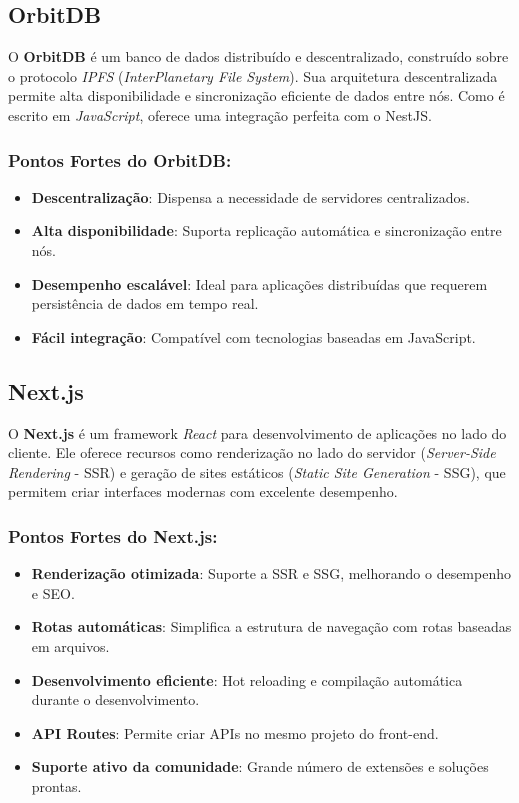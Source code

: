\subsection{OrbitDB}

O \textbf{OrbitDB} é um banco de dados distribuído e descentralizado, construído sobre o protocolo \textit{IPFS} (\textit{InterPlanetary File System}). Sua arquitetura descentralizada permite alta disponibilidade e sincronização eficiente de dados entre nós. Como é escrito em \textit{JavaScript}, oferece uma integração perfeita com o NestJS.

\subsubsection*{Pontos Fortes do OrbitDB:}
\begin{itemize}
    \item \textbf{Descentralização}: Dispensa a necessidade de servidores centralizados.
    \item \textbf{Alta disponibilidade}: Suporta replicação automática e sincronização entre nós.
    \item \textbf{Desempenho escalável}: Ideal para aplicações distribuídas que requerem persistência de dados em tempo real.
    \item \textbf{Fácil integração}: Compatível com tecnologias baseadas em JavaScript.
\end{itemize}

\subsection{Next.js}

O \textbf{Next.js} é um framework \textit{React} para desenvolvimento de aplicações no lado do cliente. Ele oferece recursos como renderização no lado do servidor (\textit{Server-Side Rendering} - SSR) e geração de sites estáticos (\textit{Static Site Generation} - SSG), que permitem criar interfaces modernas com excelente desempenho.

\subsubsection*{Pontos Fortes do Next.js:}
\begin{itemize}
    \item \textbf{Renderização otimizada}: Suporte a SSR e SSG, melhorando o desempenho e SEO.
    \item \textbf{Rotas automáticas}: Simplifica a estrutura de navegação com rotas baseadas em arquivos.
    \item \textbf{Desenvolvimento eficiente}: Hot reloading e compilação automática durante o desenvolvimento.
    \item \textbf{API Routes}: Permite criar APIs no mesmo projeto do front-end.
    \item \textbf{Suporte ativo da comunidade}: Grande número de extensões e soluções prontas.
\end{itemize}

